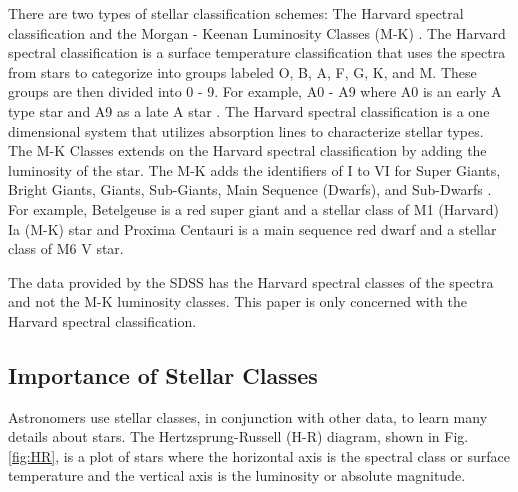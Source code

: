 \documentclass[conference]{IEEEtran}
\begin{document}
	There are two types of stellar classification schemes: The Harvard spectral classification and the Morgan - Keenan Luminosity Classes (M-K) \cite{Carroll}. The Harvard spectral classification is a surface temperature classification that uses the spectra from stars to categorize into groups labeled O, B, A, F, G, K, and M. These groups are then divided into 0 - 9. For example, A0 - A9 where A0 is an early A type star and A9 as a late A star \cite{Carroll}. The Harvard spectral classification is a one dimensional system that utilizes absorption lines to characterize stellar types. The M-K Classes extends on the Harvard spectral classification by adding the luminosity of the star. The M-K adds the identifiers of I to VI for Super Giants, Bright Giants, Giants, Sub-Giants, Main Sequence (Dwarfs), and Sub-Dwarfs \cite{Carroll}. For example, Betelgeuse is a red super giant and a stellar class of M1 (Harvard) Ia (M-K) star and Proxima Centauri is a main sequence red dwarf and a stellar class of M6 V star. 
        
        The data provided by the SDSS has the Harvard spectral classes of the spectra and not the M-K luminosity classes. This paper is only concerned with the Harvard spectral classification.

	\subsection{Importance of Stellar Classes}\label{sec:importance}

        	Astronomers use stellar classes, in conjunction with other data, to learn many details about stars. The Hertzsprung-Russell (H-R) diagram, shown in Fig. \ref{fig:HR}, is a plot of stars where the horizontal axis is the spectral class or surface temperature and the vertical axis is the luminosity or absolute magnitude.
  
\end{document}
